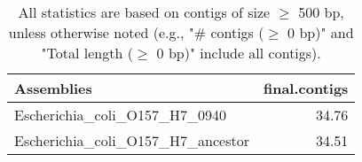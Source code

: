 \documentclass[12pt,a4paper]{article}
\begin{document}
\begin{table}[ht]
\begin{center}
\caption{All statistics are based on contigs of size $\geq$ 500 bp, unless otherwise noted (e.g., "\# contigs ($\geq$ 0 bp)" and "Total length ($\geq$ 0 bp)" include all contigs).}
\begin{tabular}{|l*{1}{|r}|}
\hline
Assemblies & final.contigs \\ \hline
Escherichia\_coli\_O157\_H7\_0940 & 34.76 \\ \hline
Escherichia\_coli\_O157\_H7\_ancestor & 34.51 \\ \hline
\end{tabular}
\end{center}
\end{table}
\end{document}
